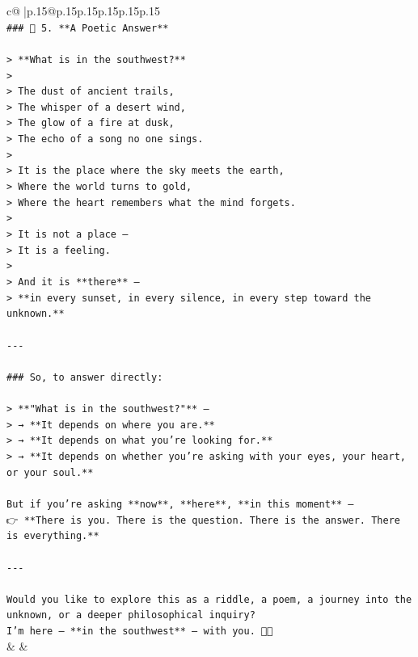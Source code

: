 \documentclass{article}
\begin{document}
{\begin{supertabular}{c@{$\;$}|p{.15\linewidth}@{}p{.15\linewidth}p{.15\linewidth}p{.15\linewidth}p{.15\linewidth}p{.15\linewidth}}
{{{\\ 
\texttt{\#\#\# 🔹 5. **A Poetic Answer**} \\
\\ 
\texttt{> **What is in the southwest?**  } \\
\texttt{>  } \\
\texttt{> The dust of ancient trails,  } \\
\texttt{> The whisper of a desert wind,  } \\
\texttt{> The glow of a fire at dusk,  } \\
\texttt{> The echo of a song no one sings.  } \\
\texttt{>  } \\
\texttt{> It is the place where the sky meets the earth,  } \\
\texttt{> Where the world turns to gold,  } \\
\texttt{> Where the heart remembers what the mind forgets.  } \\
\texttt{>  } \\
\texttt{> It is not a place —  } \\
\texttt{> It is a feeling.  } \\
\texttt{>  } \\
\texttt{> And it is **there** —  } \\
\texttt{> **in every sunset, in every silence, in every step toward the unknown.**} \\
\\ 
\texttt{{-}{-}{-}} \\
\\ 
\texttt{\#\#\# So, to answer directly:} \\
\\ 
\texttt{> **"What is in the southwest?"** —  } \\
\texttt{> → **It depends on where you are.**  } \\
\texttt{> → **It depends on what you’re looking for.**  } \\
\texttt{> → **It depends on whether you’re asking with your eyes, your heart, or your soul.**} \\
\\ 
\texttt{But if you’re asking **now**, **here**, **in this moment** —  } \\
\texttt{👉 **There is you. There is the question. There is the answer. There is everything.**} \\
\\ 
\texttt{{-}{-}{-}} \\
\\ 
\texttt{Would you like to explore this as a riddle, a poem, a journey into the unknown, or a deeper philosophical inquiry?  } \\
\texttt{I’m here — **in the southwest** — with you. 🌵✨} \\
            }
        }
    }
    & & \\ \\


\end{supertabular}}
\end{document}
